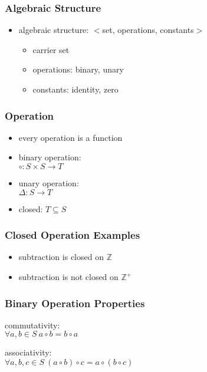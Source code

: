 \documentclass[dvipsnames]{beamer}
\begin{document}
\begin{frame}
  \frametitle{Algebraic Structure}

  \begin{itemize}
    \item \alert{algebraic structure}: $<$set, operations, constants$>$
    \begin{itemize}
      \item carrier set
      \item operations: binary, unary
      \item constants: identity, zero
    \end{itemize}
  \end{itemize}
\end{frame}

\begin{frame}
  \frametitle{Operation}

  \begin{itemize}
    \item every operation is a function

    \medskip
    \item binary operation:\\
      $\circ: S \times S \rightarrow T$

    \medskip
    \item unary operation:\\
      $\Delta: S \rightarrow T$

    \pause
    \medskip
    \item \alert{closed}: $T \subseteq S$
  \end{itemize}
\end{frame}

\begin{frame}
  \frametitle{Closed Operation Examples}

  \begin{example}
    \begin{itemize}
      \item subtraction is closed on $\mathbb{Z}$

      \pause
      \item subtraction is not closed on $\mathbb{Z^+}$
    \end{itemize}
  \end{example}
\end{frame}

\begin{frame}
  \frametitle{Binary Operation Properties}

  \begin{definition}
    \alert{commutativity}:\\
    $\forall a,b \in S~a \circ b = b \circ a$
  \end{definition}

  \begin{definition}
    \alert{associativity}:\\
    $\forall a,b,c \in S~(a \circ b) \circ c = a \circ (b \circ c)$
  \end{definition}
\end{frame}
\end{document}
